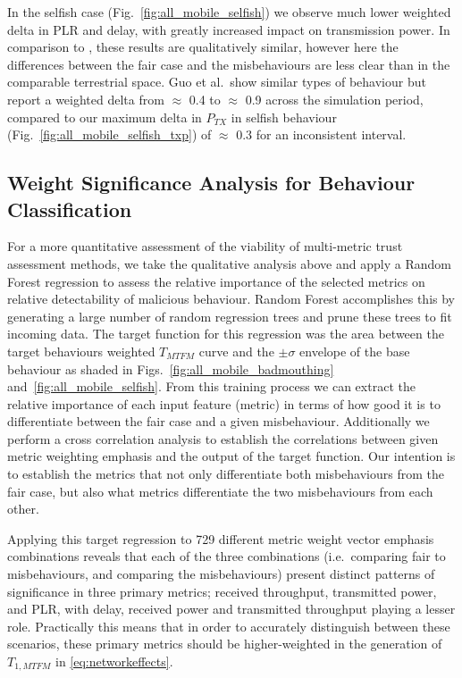In the selfish case (Fig.~\ref{fig:all_mobile_selfish}) we observe much lower weighted delta in PLR and delay, with greatly increased impact on transmission power.
In comparison to \cite{Guo11}, these results are qualitatively similar, however here the differences between the fair case and the misbehaviours are less clear than in the comparable terrestrial space.
Guo et al.\ show similar types of behaviour but report a weighted delta from $\approx$ 0.4 to $\approx$ 0.9 across the simulation period, compared to our maximum delta in $P_{TX}$ in selfish behaviour (Fig.~\ref{fig:all_mobile_selfish_txp}) of $\approx$ 0.3 for an inconsistent interval.


\subsection{Weight Significance Analysis for Behaviour Classification}

For a more quantitative assessment of the viability of multi-metric trust assessment methods, we take the qualitative analysis above and apply a Random Forest regression \cite{Breiman2001} to assess the relative importance of the selected metrics on relative detectability of malicious behaviour. 
Random Forest accomplishes this by generating a large number of random regression trees and prune these trees to fit incoming data.
The target function for this regression was the area between the target behaviours weighted $T_{MTFM}$ curve and the $\pm\sigma$ envelope of the base behaviour as shaded in Figs.~\ref{fig:all_mobile_badmouthing} and~\ref{fig:all_mobile_selfish}.
From this training process we can extract the relative importance of each input feature (metric) in terms of how good it is to differentiate between the fair case and a given misbehaviour.
Additionally we perform a cross correlation analysis to establish the correlations between given metric weighting emphasis and the output of the target function.
Our intention is to establish the metrics that not only differentiate both misbehaviours from the fair case, but also what metrics differentiate the two misbehaviours from each other.

Applying this target regression to 729 different metric weight vector emphasis combinations reveals that each of the three combinations (i.e.\ comparing fair to misbehaviours, and comparing the misbehaviours) present distinct patterns of significance in three primary metrics; received throughput, transmitted power, and PLR, with delay, received power and transmitted throughput playing a lesser role.
Practically this means that in order to accurately distinguish between these scenarios, these primary metrics should be higher-weighted in the generation of $T_{1,MTFM}$ in \eqref{eq:networkeffects}.


